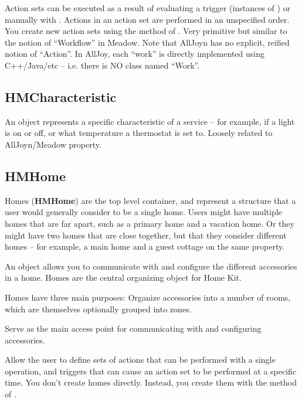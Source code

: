 \documentclass{myproc}
\begin{document}
Action sets can be executed as a result of evaluating a
\textcolor{red2}{trigger} (instances of 
) or manually with . Actions in an
action set 
are performed in an unspecified order. You create new action sets using the
 method of . 
\textcolor{red2}{Very primitive but similar to the notion of ``Workflow'' in
  Meadow. Note that AllJoyn has no explicit, reified notion of
  ``Action''. In AllJoy, each ``work'' is directly implemented using
  C++/Java/etc -- i.e. there is NO class named ``Work''.} 


\subsection{HMCharacteristic}
An  object represents a specific characteristic of a
service -- for example, if a light is on or off, or what temperature a
thermostat is set to.  
\textcolor{red2}{Loosely related to AllJoyn/Meadow property.}

\subsection{HMHome}
\textcolor{blue2}{Homes (\textbf{HMHome}) are the top level container, and
  represent a structure that a 
user would generally consider to be a single home. Users might have multiple
homes that are far apart, such as a primary home and a vacation home. Or they
might have two homes that are close together, but that they consider different
homes  -- for example, a main home and a guest cottage on the same property. }

An  object allows you to communicate with and configure the
different accessories in a home. Homes are the central organizing object for
Home Kit. 

Homes have three main purposes:
\bit
\w Organize accessories into a number of rooms, which are themselves
optionally grouped into zones. 

\w Serve as the main access point for communicating with and configuring
accessories. 

\w Allow the user to define sets of actions that can be performed with a
single operation, and triggers that can cause an action set to be performed at
a specific time. 
\eit
You don’t create homes directly. Instead, you create them with the 
 method of .
\end{document}
